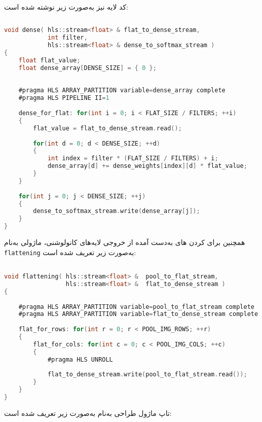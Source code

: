 کد لایه  نیز به‌صورت زیر نوشته شده است:

\begin{latin}
\begin{lstlisting}[language=C,caption={HLS Implementation of Dense Layer}]
	
void dense( hls::stream<float> & flat_to_dense_stream,
			int filter,
			hls::stream<float> & dense_to_softmax_stream )
{
	float flat_value;
	float dense_array[DENSE_SIZE] = { 0 };
	
	
	#pragma HLS ARRAY_PARTITION variable=dense_array complete
	#pragma HLS PIPELINE II=1
	
	dense_for_flat: for(int i = 0; i < FLAT_SIZE / FILTERS; ++i)
	{
		flat_value = flat_to_dense_stream.read();
		
		for(int d = 0; d < DENSE_SIZE; ++d)
		{
			int index = filter * (FLAT_SIZE / FILTERS) + i;
			dense_array[d] += dense_weights[index][d] * flat_value;
		}
	}
	
	for(int j = 0; j < DENSE_SIZE; ++j)
	{
		dense_to_softmax_stream.write(dense_array[j]);
	}
}
\end{lstlisting}
\end{latin}



همچنین برای  کردن  های به‌دست آمده از خروجی لایه‌های کانولوشنی، ماژولی به‌نام \texttt{flattening} به‌صورت زیر تعریف شده است:

\begin{latin}
\begin{lstlisting}[language=C,caption={HLS Implementation of Flatten Layers}]

void flattening( hls::stream<float> &  pool_to_flat_stream,
				 hls::stream<float> &  flat_to_dense_stream )
{
	
	#pragma HLS ARRAY_PARTITION variable=pool_to_flat_stream complete
	#pragma HLS ARRAY_PARTITION variable=flat_to_dense_stream complete
	
	flat_for_rows: for(int r = 0; r < POOL_IMG_ROWS; ++r)
	{
		flat_for_cols: for(int c = 0; c < POOL_IMG_COLS; ++c)
		{
			#pragma HLS UNROLL
			
			flat_to_dense_stream.write(pool_to_flat_stream.read());
		}
	}
}
\end{lstlisting}
\end{latin}


تاپ ماژول طراحی به‌نام  به‌صورت زیر تعریف شده است: \newpage

